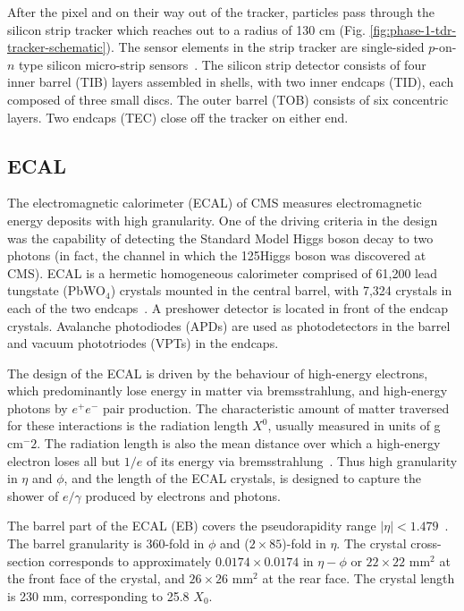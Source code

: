 After the pixel and on their way out of the tracker, particles pass through the silicon strip tracker which reaches out to a radius of 130 cm (Fig. \ref{fig:phase-1-tdr-tracker-schematic}). The sensor elements in the strip tracker are single-sided $p$-on-$n$ type silicon micro-strip sensors~\cite{CMS-2008-JINST-3-S08004}. The silicon strip detector consists of four inner barrel (TIB) layers assembled in shells, with two inner endcaps (TID), each composed of three small discs. The outer barrel (TOB) consists of six concentric layers. Two endcaps (TEC) close off the tracker on either end. 


\subsection{ECAL} 
The electromagnetic calorimeter (ECAL) of CMS measures electromagnetic energy deposits with high granularity. One of the driving criteria in the design was the capability of detecting the Standard Model Higgs boson decay to two photons (in fact, the channel in which the 125\GeV Higgs boson was discovered at CMS). 
ECAL is a hermetic homogeneous calorimeter comprised of 61,200 lead tungstate (PbWO$_4$) crystals mounted in the central barrel, with 7,324 crystals in each of the two endcaps~\cite{CMS-2008-JINST-3-S08004}. A preshower detector is located in front of the endcap crystals. Avalanche photodiodes (APDs) are used as photodetectors in the barrel and vacuum phototriodes (VPTs) in the endcaps. 

The design of the ECAL is driven by the behaviour of high-energy electrons, which predominantly lose energy in matter via bremsstrahlung, and high-energy photons by $e^+ e^-$ pair production. The characteristic amount of matter traversed for these interactions is the radiation length $X^0$, usually measured in units of g cm$^-2$. The radiation length is also the mean distance over which a high-energy electron loses all but $1/e$ of its energy via bremsstrahlung~\cite{workman_review_2022}. Thus high granularity in $\eta$ and $\phi$, and the length of the ECAL crystals, is designed to capture the shower of $e/\gamma$ produced by electrons and photons.

The barrel part of the ECAL (EB) covers the pseudorapidity range $|\eta| < 1.479$~\cite{CMS-2008-JINST-3-S08004}. The barrel granularity is 360-fold in $\phi$ and ($2 \times 85$)-fold in $\eta$. The crystal cross-section corresponds to approximately $0.0174 \times 0.0174$ in $\eta-\phi$ or $22 \times 22$ mm$^2$ at the front face of the crystal, and $26 \times 26$ mm$^2$ at the rear face. The crystal length is 230 mm, corresponding to 25.8 $X_0$.

